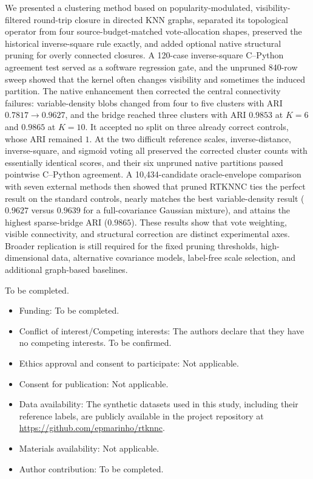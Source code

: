 \documentclass[pdflatex,sn-mathphys-num]{sn-jnl}
\begin{document}
We presented a clustering method based on popularity-modulated,
visibility-filtered round-trip closure in directed KNN graphs, separated its
topological operator from four source-budget-matched vote-allocation shapes,
preserved the historical inverse-square rule exactly, and added optional native
structural pruning for overly connected closures.  A 120-case inverse-square
C--Python agreement test served as a software regression gate, and the
unpruned 840-row sweep showed that the kernel often changes visibility and
sometimes the induced partition.  The native enhancement then corrected the
central connectivity failures: variable-density blobs changed from four to
five clusters with ARI $0.7817\to0.9627$, and the bridge reached three clusters
with ARI $0.9853$ at $K=6$ and $0.9865$ at $K=10$.  It accepted no split on
three already correct controls, whose ARI remained $1$.  At the two difficult
reference scales, inverse-distance, inverse-square, and sigmoid voting all
preserved the corrected cluster counts with essentially identical scores, and
their six unpruned native partitions passed pointwise C--Python agreement.
A 10,434-candidate oracle-envelope comparison with seven external methods then
showed that pruned RTKNNC ties the perfect result on the standard controls,
nearly matches the best variable-density result ($0.9627$ versus $0.9639$ for
a full-covariance Gaussian mixture), and attains the highest sparse-bridge ARI
($0.9865$).  These results show that vote weighting, visible connectivity, and
structural correction are distinct experimental axes.  Broader replication is
still required for the fixed pruning thresholds, high-dimensional data,
alternative covariance models, label-free scale selection, and additional
graph-based baselines.

\backmatter

To be completed.

\begin{itemize}
\item Funding: To be completed.
\item Conflict of interest/Competing interests: The authors declare that they have no competing interests. To be confirmed.
\item Ethics approval and consent to participate: Not applicable.
\item Consent for publication: Not applicable.
\item Data availability: The synthetic datasets used in this study, including their reference labels, are publicly available in the project repository at \url{https://github.com/epmarinho/rtknnc}.
\item Materials availability: Not applicable.
\item Author contribution: To be completed.
\end{itemize}


\end{document}
